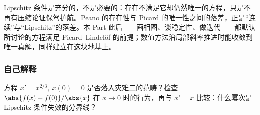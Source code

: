 Lipschitz 条件是充分的，不是必要的：存在不满足它却仍然唯一的方程，只是不再有压缩论证保驾护航。Peano 的存在性与 Picard 的唯一性之间的落差，正是``连续''与``Lipschitz''的落差。本 Part 此后——画相图、谈稳定性、做迭代——都默认所讨论的方程满足 Picard--Lindelöf 的前提；数值方法沿局部斜率推进时能收敛到唯一真解，同样建立在这块地基上。

\subsubsection{自己解释}

方程 \(x'=x^{2/3},\ x(0)=0\) 是否落入灾难二的范畴？检查 \(\abs{f(x)-f(0)}/\abs{x}\) 在 \(x\to0\) 时的行为，再与 \(x'=x\) 比较：什么幂次是 Lipschitz 条件失效的分界线？
